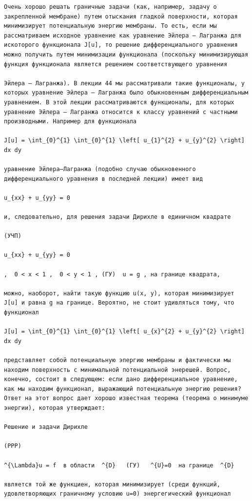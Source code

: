 \documentclass[
  ukrainian,
]{article}
\begin{document}
\begin{verbatim}
Очень хорошо решать граничные задачи (как, например, задачу о закрепленной мембране) путем отыскания гладкой поверхности, которая минимизирует потенциальную энергию мембраны. То есть, если мы рассматриваем исходное уравнение как уравнение Эйлера — Лагранжа для искоторого функционала J[u], то решение дифференциального уравнения можно получить путем минимизации функционала (поскольку минимизирующая функция функционала является решением соответствующего уравнения

Эйлера — Лагранжа). В лекции 44 мы рассматривали такие функционалы, у которых уравнение Эйлера — Лагранжа было обыкновенным дифференциальным уравнением. В этой лекции рассматриваются функционалы, для которых уравнение Эйлера — Лагранжа относится к классу уравнений с частными производными. Например для функционала

J[u] = \int_{0}^{1} \int_{0}^{1} \left[ u_{1}^{2} + u_{y}^{2} \right] dx dy

уравнение Эйлера—Лагранжа (подобно случаю обыкновенного дифференциального уравнения в последней лекции) имеет вид

u_{xx} + u_{yy} = 0

и, следовательно, для решения задачи Дирихле в единичном квадрате

(УЧП)

u_{xx} + u_{yy} = 0

,  0 < x < 1 ,  0 < y < 1 , (ГУ)  u = g , на границе квадрата,

можно, наоборот, найти такую функцию u(x, y), которая минимизирует J[u] и равна g на границе. Вероятно, не стоит удивляться тому, что функционал

J[u] = \int_{0}^{1} \int_{0}^{1} \left[ u_{x}^{2} + u_{y}^{2} \right] dx dy

представляет собой потенциальную эпергию мембраны и фактически мы находим поверхность с минимальной потенциальной энерешей. Вопрос, конечно, состоит в следующем: если дано дифференциальное уравнение, как мы находим функционал, выражающий потенциальную энергию решения? Ответ на этот вопрос дает хорошо известная теорема (теорема о минимуме энергии), которая утверждает:

Решение и задачи Дирихле

(PPP)

^{\Lambda}u = f  в области  ^{D}   (ГУ)   ^{U}=0  на границе  ^{D}

является той же функциен, которая минимизирует (среди функций, удовлетворяющих граничному условию u=0) энергегический функционал


\end{verbatim}
\end{document}
